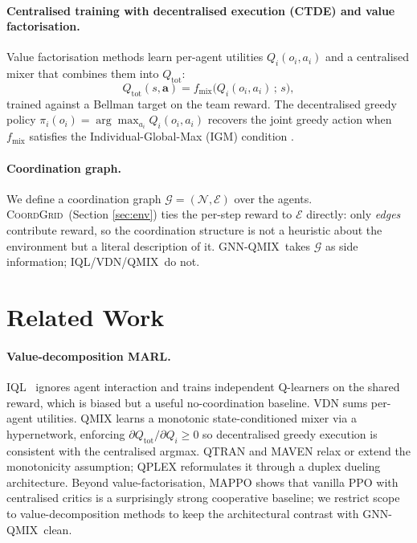 \documentclass[manuscript, screen, review]{jair}
\providecommand{\citep}{\parencite}
\newcommand{\algoname}[1]{\textsc{#1}}
\newcommand{\iql}{\algoname{IQL}}
\newcommand{\vdn}{\algoname{VDN}}
\newcommand{\qmix}{\algoname{QMIX}}
\newcommand{\gnnqmix}{\algoname{GNN-QMIX}}
\newcommand{\coordgrid}{\textsc{CoordGrid}}
\newcommand{\Qtot}{Q_{\mathrm{tot}}}
\newcommand{\Qi}{Q_i}
\newcommand{\Nset}{\mathcal{N}}
\newcommand{\Egraph}{\mathcal{E}}
\newcommand{\Gtask}{\mathcal{G}}
\begin{document}
\paragraph{Centralised training with decentralised execution (CTDE) and
value factorisation.} Value factorisation methods learn per-agent
utilities $\Qi(o_i, a_i)$ and a centralised mixer that combines them into
$\Qtot$:
\[
  \Qtot(s, \mathbf{a}) = f_{\text{mix}}\bigl(\Qi(o_i, a_i)\,;\,s\bigr),
\]
trained against a Bellman target on the team reward. The decentralised
greedy policy $\pi_i(o_i) = \arg\max_{a_i} \Qi(o_i, a_i)$ recovers the
joint greedy action when $f_{\text{mix}}$ satisfies the Individual-Global-Max
(IGM) condition \citep{son_2019_qtran}.

\paragraph{Coordination graph.} We define a coordination graph
$\Gtask = (\Nset, \Egraph)$ over the agents. \coordgrid\ (Section
\ref{sec:env}) ties the per-step reward to $\Egraph$ directly: only
\emph{edges} contribute reward, so the coordination structure is not a
heuristic about the environment but a literal description of it.
\gnnqmix\ takes $\Gtask$ as side information; \iql/\vdn/\qmix\ do not.

\section{Related Work}
\label{sec:related}

\paragraph{Value-decomposition MARL.} \iql~\citep{tan_1993_marl} ignores
agent interaction and trains independent Q-learners on the shared reward,
which is biased but a useful no-coordination baseline. \vdn
\citep{sunehag_2018_vdn} sums per-agent utilities. \qmix
\citep{rashid_2018_qmix,rashid_2020_qmix_jmlr} learns a monotonic state-conditioned
mixer via a hypernetwork, enforcing $\partial \Qtot / \partial \Qi \geq 0$
so decentralised greedy execution is consistent with the centralised
argmax. \algoname{QTRAN} \citep{son_2019_qtran} and \algoname{MAVEN}
\citep{mahajan_2019_maven} relax or extend the monotonicity assumption;
\algoname{QPLEX} \citep{wang_2021_qplex} reformulates it through a
duplex dueling architecture. Beyond value-factorisation,
\algoname{MAPPO} \citep{yu_2022_mappo} shows that vanilla PPO with
centralised critics is a surprisingly strong cooperative baseline; we
restrict scope to value-decomposition methods to keep the architectural
contrast with \gnnqmix\ clean.
\end{document}
